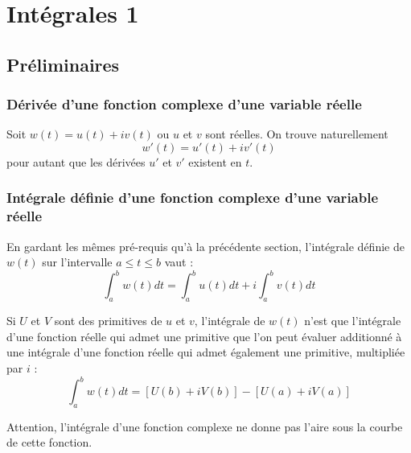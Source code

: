 \chapter{Intégrales 1}

\section{Préliminaires}

\subsection{Dérivée d'une fonction complexe d'une variable réelle}
Soit $w(t) = u(t) +iv(t)$ ou $u$ et $v$ sont réelles. On trouve naturellement 
\begin{equation}
	w'(t) = u'(t) + iv'(t)
\end{equation}
pour autant que les dérivées $u'$ et $v'$ existent en $t$.\\
    
    
\subsection{Intégrale définie d'une fonction complexe d'une variable réelle}
En gardant les mêmes pré-requis qu'à la précédente section, l'intégrale définie de $w(t)$ sur
l'intervalle $a \leq t \leq b$ vaut :
\begin{equation}
	\int_a^b w(t) dt = \int_a^b u(t) dt + i\int_a^b v(t)dt
\end{equation}
    
Si $U$ et $V$ sont des primitives de $u$ et $v$, l'intégrale de $w(t)$ n'est que l'intégrale 
d'une fonction réelle qui admet une primitive que l'on peut évaluer additionné à une intégrale
d'une fonction réelle qui admet également une primitive, multipliée par $i$ :
\begin{equation}
	\int_a^b w(t)dt = [U(b) + iV(b)] - [U(a) + iV(a)]
\end{equation}
 
Attention, l'intégrale d'une fonction complexe ne donne pas l'aire sous la courbe de cette fonction.   
    
